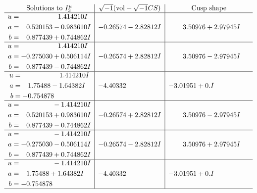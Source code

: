 \documentclass[1p]{elsarticle_modified}
\theoremstyle{definition}
\newcommand{\I}{\sqrt{-1}}
\begin{document}
$$\begin{array}{c|c|c}  
\text{Solutions to }I^u_{3}& \I (\text{vol} + \sqrt{-1}CS) & \text{Cusp shape}\\
 \hline 
\begin{aligned}
u &= \phantom{-0.000000 -}1.414210 I \\
a &= \phantom{-}0.520153 - 0.983610 I \\
b &= \phantom{-}0.877439 + 0.744862 I\end{aligned}
 & -0.26574 - 2.82812 I & \phantom{-}3.50976 + 2.97945 I \\ \hline\begin{aligned}
u &= \phantom{-0.000000 -}1.414210 I \\
a &= -0.275030 + 0.506114 I \\
b &= \phantom{-}0.877439 - 0.744862 I\end{aligned}
 & -0.26574 + 2.82812 I & \phantom{-}3.50976 - 2.97945 I \\ \hline\begin{aligned}
u &= \phantom{-0.000000 -}1.414210 I \\
a &= \phantom{-}1.75488 - 1.64382 I \\
b &= -0.754878\phantom{ +0.000000I}\end{aligned}
 & -4.40332\phantom{ +0.000000I} & -3.01951 + 0. I\phantom{ +0.000000I} \\ \hline\begin{aligned}
u &= \phantom{-0.000000 } -1.414210 I \\
a &= \phantom{-}0.520153 + 0.983610 I \\
b &= \phantom{-}0.877439 - 0.744862 I\end{aligned}
 & -0.26574 + 2.82812 I & \phantom{-}3.50976 - 2.97945 I \\ \hline\begin{aligned}
u &= \phantom{-0.000000 } -1.414210 I \\
a &= -0.275030 - 0.506114 I \\
b &= \phantom{-}0.877439 + 0.744862 I\end{aligned}
 & -0.26574 - 2.82812 I & \phantom{-}3.50976 + 2.97945 I \\ \hline\begin{aligned}
u &= \phantom{-0.000000 } -1.414210 I \\
a &= \phantom{-}1.75488 + 1.64382 I \\
b &= -0.754878\phantom{ +0.000000I}\end{aligned}
 & -4.40332\phantom{ +0.000000I} & -3.01951 + 0. I\phantom{ +0.000000I}\\
 \hline 
 \end{array}$$\newpage\newpage\renewcommand{\arraystretch}{1}
\end{document}
